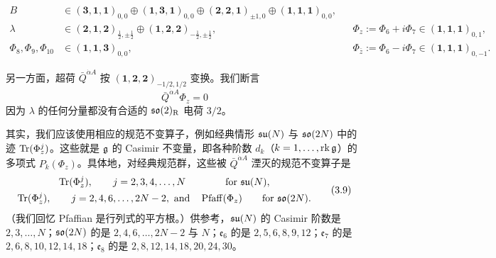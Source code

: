 \begin{equation}
\begin{aligned}
B &\in (\mathbf{3},\mathbf{1},\mathbf{1})_{0,0}\oplus(\mathbf{1},\mathbf{3},\mathbf{1})_{0,0}\oplus(\mathbf{2},\mathbf{2},\mathbf{1})_{\pm1,0}\oplus(\mathbf{1},\mathbf{1},\mathbf{1})_{0,0},\\
\lambda &\in (\mathbf{2},\mathbf{1},\mathbf{2})_{\tfrac12,\pm\tfrac12}\oplus(\mathbf{1},\mathbf{2},\mathbf{2})_{-\tfrac12,\pm\tfrac12},
&&\Phi_z := \Phi_6+i\Phi_7\in(\mathbf{1},\mathbf{1},\mathbf{1})_{0,1},\\
\Phi_8,\Phi_9,\Phi_{10} &\in(\mathbf{1},\mathbf{1},\mathbf{3})_{0,0},
&&\Phi_{\bar z} := \Phi_6-i\Phi_7\in(\mathbf{1},\mathbf{1},\mathbf{1})_{0,-1} .
\end{aligned}
\tag{3.7}
\end{equation}

另一方面，超荷 $\bar Q^{\dot\alpha A}$ 按 $(\mathbf{1},\mathbf{2},\mathbf{2})_{-1/2,1/2}$ 变换。我们断言
\begin{equation}
\bar Q^{\dot\alpha A}\Phi_z = 0
\tag{3.8}
\end{equation}
因为 $\lambda$ 的任何分量都没有合适的 $\mathfrak{so}(2)_{\mathrm R}$ 电荷 $3/2$。

其实，我们应该使用相应的规范不变算子，例如经典情形 $\mathfrak{su}(N)$ 与 $\mathfrak{so}(2N)$ 中的迹 $\operatorname{Tr}(\Phi^j_z)$。这些就是 $\mathfrak{g}$ 的 Casimir 不变量，即各种阶数 $d_k$（$k=1,\dots,\operatorname{rk}\mathfrak{g}$）的多项式 $P_k(\Phi_z)$。具体地，对经典规范群，这些被 $\bar Q^{\dot\alpha A}$ 湮灭的规范不变算子是
\begin{equation}
\begin{gathered}
\operatorname{Tr}(\Phi^j_z),\qquad j=2,3,4,\dots,N \qquad\qquad \text{for } \mathfrak{su}(N),\\
\operatorname{Tr}(\Phi^j_z),\qquad j=2,4,6,\dots,2N-2,\ \text{and}\quad \operatorname{Pfaff}(\Phi_z)\qquad \text{for } \mathfrak{so}(2N).
\end{gathered}
\tag{3.9}
\end{equation}
（我们回忆 Pfaffian 是行列式的平方根。）供参考，$\mathfrak{su}(N)$ 的 Casimir 阶数是 $2,3,\dots,N$；$\mathfrak{so}(2N)$ 的是 $2,4,6,\dots,2N-2$ 与 $N$；$\mathfrak{e}_6$ 的是 $2,5,6,8,9,12$；$\mathfrak{e}_7$ 的是 $2,6,8,10,12,14,18$；$\mathfrak{e}_8$ 的是 $2,8,12,14,18,20,24,30$。



